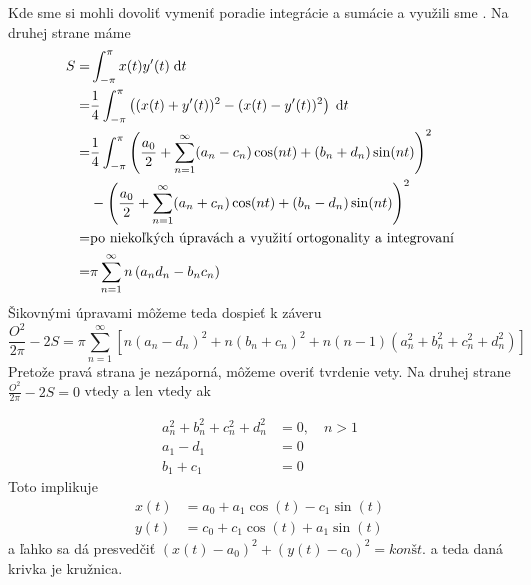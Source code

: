 \begin{dokaz}
\begin{equation}
    \end{equation}
    Kde sme si mohli dovoliť vymeniť poradie integrácie a sumácie
    a využili sme .
    Na druhej strane máme
    \begin{equation}
    \begin{split}
        S =& \int_{-\pi}^{\pi} x(t) y'(t) \; \mathrm{d} t \\
         =& \frac{1}{4}
            \int_{-\pi}^{\pi} \left(
                    (x(t) + y'(t))^2 - 
                    (x(t) - y'(t))^2 \right) \; \mathrm{d} t \\
         =& \frac{1}{4} \int_{-\pi}^{\pi}
           \left(
            \frac{a_0}{2} + \sum_{n=1}^{\infty}
              (a_n - c_n) \cos(nt) + (b_n + d_n) \sin(nt)
            \right)^2 \\&-
           \left(
            \frac{a_0}{2} + \sum_{n=1}^{\infty}
              (a_n + c_n) \cos(nt) + (b_n - d_n) \sin(nt)
            \right)^2 \\
         =& \text{po niekoľkých úpravách a využití ortogonality a
        integrovaní} \\
         =& \pi \sum_{n=1}^{\infty} n \left( a_n d_n - b_n c_n \right)
    \end{split}
    \end{equation}
    Šikovnými úpravami môžeme teda dospieť k záveru
    \begin{equation}
        \frac{O^2}{2\pi} - 2S = 
         \pi \sum_{n=1}^{\infty} \left[
            n(a_n - d_n)^2 + n (b_n+c_n)^2 + n(n-1)(a_n^2 + b_n^2 +c_n
            ^2 + d_n ^2)
         \right]
    \end{equation}
    Pretože pravá strana je nezáporná, môžeme overiť tvrdenie vety.
    Na druhej strane 
    $\frac{O^2}{2\pi} - 2S = 0$ vtedy a len vtedy ak
    
    \begin{align}
        a_n^2 + b_n^2 + c_n^2 + d_n^2 &= 0, \quad n>1 \\
        a_1 - d_1 &=0 \\
        b_1 + c_1 &=0
    \end{align}
    Toto implikuje
    \begin{align}
        x(t) &= a_0  + a_1 \cos(t) - c_1 \sin(t) \\
        y(t) &= c_0  + c_1 \cos(t) + a_1 \sin(t)
    \end{align}
    a ľahko sa dá presvedčiť
    $(x(t)-a_0)^2 + (y(t) - c_0)^2 = konšt.$ a teda daná krivka je
    kružnica.
\end{dokaz}

